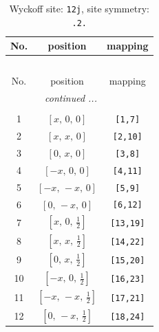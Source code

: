 \documentclass[fleqn,8pt]{jsarticle}
\begin{document}
\begin{longtable}{ccc}
\caption{Wyckoff site: {\tt 12j}, site symmetry: {\tt .2.}}
 \\
 \hline \hline
No. & position & mapping \\ \hline \endfirsthead

\multicolumn{2}{l}{\tablename\ \thetable{}} \\
 \hline \hline
No. & position & mapping \\ \hline \endhead

 \hline \hline
\multicolumn{2}{r}{\footnotesize\it continued ...} \\ \endfoot

 \hline \hline
\multicolumn{2}{r}{} \\ \endlastfoot

1 & $\left[ x,\, 0,\, 0 \right]$ & {\tt [1,7]} \\ \hline
2 & $\left[ x,\, x,\, 0 \right]$ & {\tt [2,10]} \\ \hline
3 & $\left[ 0,\, x,\, 0 \right]$ & {\tt [3,8]} \\ \hline
4 & $\left[ - x,\, 0,\, 0 \right]$ & {\tt [4,11]} \\ \hline
5 & $\left[ - x,\, - x,\, 0 \right]$ & {\tt [5,9]} \\ \hline
6 & $\left[ 0,\, - x,\, 0 \right]$ & {\tt [6,12]} \\ \hline
7 & $\left[ x,\, 0,\, \frac{1}{2} \right]$ & {\tt [13,19]} \\ \hline
8 & $\left[ x,\, x,\, \frac{1}{2} \right]$ & {\tt [14,22]} \\ \hline
9 & $\left[ 0,\, x,\, \frac{1}{2} \right]$ & {\tt [15,20]} \\ \hline
10 & $\left[ - x,\, 0,\, \frac{1}{2} \right]$ & {\tt [16,23]} \\ \hline
11 & $\left[ - x,\, - x,\, \frac{1}{2} \right]$ & {\tt [17,21]} \\ \hline
12 & $\left[ 0,\, - x,\, \frac{1}{2} \right]$ & {\tt [18,24]} \\
\end{longtable}
\renewcommand{\arraystretch}{1.2}
\end{document}
